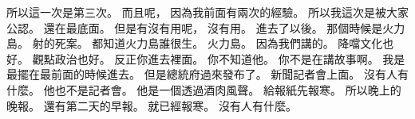 \hypertarget{c01:cue:3094}{}所以這一次是第三次。
\hypertarget{c01:cue:3095}{}而且呢，
\hypertarget{c01:cue:3096}{}因為我前面有兩次的經驗。
\hypertarget{c01:cue:3097}{}所以我這次是被大家公認。
\hypertarget{c01:cue:3098}{}還在最底面。
\hypertarget{c01:cue:3099}{}但是有沒有用呢，
\hypertarget{c01:cue:3100}{}沒有用。
\hypertarget{c01:cue:3101}{}進去了以後。
\hypertarget{c01:cue:3102}{}那個時候是火力島。
\hypertarget{c01:cue:3103}{}射的死案。
\hypertarget{c01:cue:3104}{}都知道火力島誰很生。
\hypertarget{c01:cue:3105}{}火力島。
\hypertarget{c01:cue:3106}{}因為我們講的。
\hypertarget{c01:cue:3107}{}降噹文化也好。
\hypertarget{c01:cue:3108}{}觀點政治也好。
\hypertarget{c01:cue:3109}{}反正你進去裡面。
\hypertarget{c01:cue:3110}{}你不知道他。
\hypertarget{c01:cue:3111}{}你不是在講故事啊。
\hypertarget{c01:cue:3112}{}我是最擺在最前面的時候進去。
\hypertarget{c01:cue:3113}{}但是總統府過來發布了。
\hypertarget{c01:cue:3114}{}新聞記者會上面。
\hypertarget{c01:cue:3115}{}沒有人有什麼。
\hypertarget{c01:cue:3116}{}他也不是記者會。
\hypertarget{c01:cue:3117}{}他是一個透過酒肉風聲。
\hypertarget{c01:cue:3118}{}給報紙先報寒。
\hypertarget{c01:cue:3119}{}所以晚上的晚報。
\hypertarget{c01:cue:3120}{}還有第二天的早報。
\hypertarget{c01:cue:3121}{}就已經報寒。
\hypertarget{c01:cue:3122}{}沒有人有什麼。

